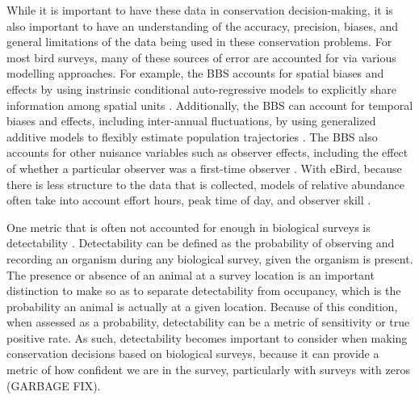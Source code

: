 \par While it is important to have these data in conservation decision-making, it is also important to have an understanding of the accuracy, precision, biases, and general limitations of the data being used in these conservation problems.
For most bird surveys, many of these sources of error are accounted for via various modelling approaches.
For example, the BBS accounts for spatial biases and effects by using instrinsic conditional auto-regressive models \citep{besag_bayesian_1991} to explicitly share information among spatial units \citep{smith_patterns_2023}. 
Additionally, the BBS can account for temporal biases and effects, including inter-annual fluctuations, by using generalized additive models \citep{wood_generalized_2017} to flexibly estimate population trajectories \citep{smith_north_2021}.
The BBS also accounts for other nuisance variables such as observer effects, including the effect of whether a particular observer was a first-time observer \citep{kendall_first-time_1996}.
With eBird, because there is less structure to the data that is collected, models of relative abundance often take into account effort hours, peak time of day, and observer skill \citep{johnston_estimates_2018, fink_double_2023}.

\par One metric that is often not accounted for enough in biological surveys is detectability \citep{bennett_how_2024}.
Detectability can be defined as the probability of observing and recording an organism during any biological survey, given the organism is present.
The presence or absence of an animal at a survey location is an important distinction to make so as to separate detectability from occupancy, which is the probability an animal is actually at a given location.
Because of this condition, when assessed as a probability, detectability can be a metric of sensitivity or true positive rate.
As such, detectability becomes important to consider when making conservation decisions based on biological surveys, because it can provide a metric of how confident we are in the survey, particularly with surveys with zeros (GARBAGE FIX).

